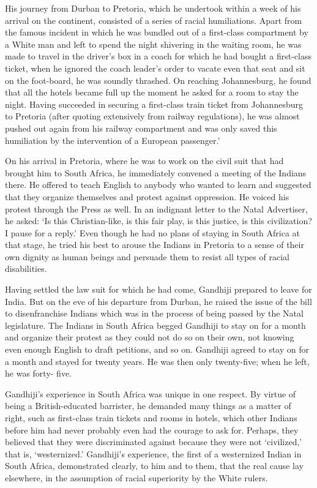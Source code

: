 His journey from Durban to Pretoria, which he undertook within a week of his arrival on the continent, consisted of a series of racial humiliations. Apart from the famous incident in which he was bundled out of a first-class compartment by a White man and left to spend the night shivering in the waiting room, he was made to travel in the driver's box in a coach for which he had bought a first-class ticket, when he ignored the coach leader's order to vacate even that seat and sit on the foot-board, he was soundly thrashed. On reaching Johannesburg, he found that all the hotels became full up the moment he asked for a room to stay the night. Having succeeded in securing a first-class train ticket from Johannesburg to Pretoria (after quoting extensively from railway regulations), he was almost pushed out again from his railway compartment and was only saved this humiliation by the intervention of a European passenger.'

On his arrival in Pretoria, where he was to work on the civil suit that had brought him to South Africa, he immediately convened a meeting of the Indians there. He offered to teach English to anybody who wanted to learn and suggested that they organize themselves and protest against oppression. He voiced his protest through the Press as well. In an indignant letter to the Natal Advertiser, he asked: `Is this Christian-like, is this fair play, is this justice, is this civilization? I pause for a reply.' Even though he had no plans of staying in South Africa at that stage, he tried his best to arouse the Indians in Pretoria to a sense of their own dignity as human beings and persuade them to resist all types of racial disabilities.

Having settled the law suit for which he had come, Gandhiji prepared to leave for India. But on the eve of his departure from Durban, he raised the issue of the bill to disenfranchise Indians which was in the process of being passed by the Natal legislature. The Indians in South Africa begged Gandhiji to stay on for a month and organize their protest as they could not do so on their own, not knowing even enough English to draft petitions, and so on. Gandhiji agreed to stay on for a month and stayed for twenty years. He was then only twenty-five; when he left, he was forty- five.

Gandhiji's experience in South Africa was unique in one respect. By virtue of being a British-educated barrister, he demanded many things as a matter of right, such as first-class train tickets and rooms in hotels, which other Indians before him had never probably even had the courage to ask for. Perhaps, they believed that they were discriminated against because they were not `civilized,' that is, `westernized.' Gandhiji's experience, the first of a westernized Indian in South Africa, demonstrated clearly, to him and to them, that the real cause lay elsewhere, in the assumption of racial superiority by the White rulers.

